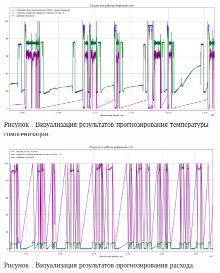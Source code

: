 {  \begin{figure}
    \centering
    \def\svgwidth{\textwidth}
    \includegraphics[width=\textheight]{images/TE100test.png}
    \caption*{\gostFont Рисунок \thechaptercntr .\theimagecntr \spc {--} Визуализация результатов прогнозирования температуры гомогенизации.}
    \label{fig:TE100VisualPredict}
  \end{figure} \addtocounter{imagecntr}{1}

  \begin{figure}
    \centering
    \def\svgwidth{\textwidth}
    \includegraphics[width=\textheight]{images/FE101test.png}
    \caption*{\gostFont Рисунок \thechaptercntr .\theimagecntr \spc {--} Визуализация результатов прогнозирования расхода.}
    \label{fig:FE101VisualPredict}
  \end{figure} \addtocounter{imagecntr}{1}

}

\setcounter{subchaptercntr}{1}
\setcounter{formulacntr}{1}
\setcounter{imagecntr}{1}
